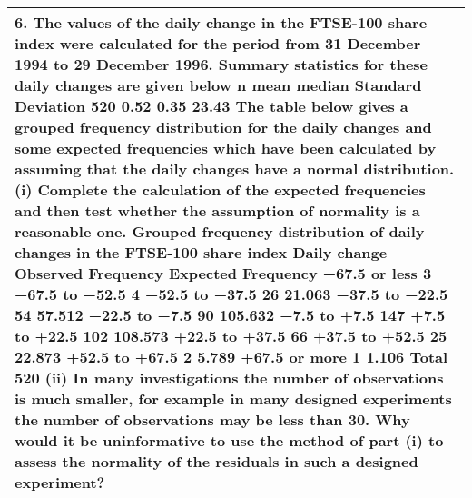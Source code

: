 \documentclass[a4paper,12pt]{article}
\begin{document}
\begin{table}[ht!]
 \centering
 \begin{tabular}{|p{15cm}|}
 \hline  
6. The values of the daily change in the FTSE-100 share index were calculated for the period from 31 December 1994 to 29 December 1996. Summary statistics for these daily changes are given below
n mean median Standard Deviation 520 0.52 0.35 23.43
The table below gives a grouped frequency distribution for the daily changes and some expected frequencies which have been calculated by assuming that the daily changes have a normal distribution.
(i) Complete the calculation of the expected frequencies and then test whether the assumption of normality is a reasonable one.
 Grouped frequency distribution of daily changes in the FTSE-100 share index
Daily change Observed Frequency
Expected Frequency
 −67.5  or less 3 −67.5  to −52.5 4 −52.5  to −37.5 26 21.063 −37.5  to −22.5 54 57.512 −22.5  to   −7.5 90 105.632 −7.5    to   +7.5 147 +7.5   to  +22.5 102 108.573 +22.5  to  +37.5 66 +37.5  to  +52.5 25 22.873 +52.5  to  +67.5 2 5.789 +67.5  or more 1 1.106 Total 520
(ii) In many investigations the number of observations is much smaller, for example in many designed experiments the number of observations may be less than 30. Why would it be uninformative to use the method of part (i) to assess the normality of the residuals in such a designed experiment?

\\ \hline
  \end{tabular}
\end{table}
\end{document}

